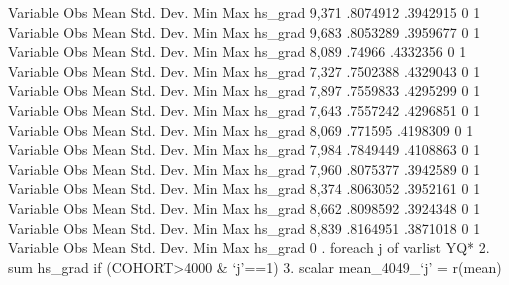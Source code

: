 {\smallskip}
    Variable {\VBAR}        Obs        Mean    Std. Dev.       Min        Max
     hs_grad {\VBAR}      9,371    .8074912    .3942915          0          1
{\smallskip}
    Variable {\VBAR}        Obs        Mean    Std. Dev.       Min        Max
     hs_grad {\VBAR}      9,683    .8053289    .3959677          0          1
{\smallskip}
    Variable {\VBAR}        Obs        Mean    Std. Dev.       Min        Max
     hs_grad {\VBAR}      8,089      .74966    .4332356          0          1
{\smallskip}
    Variable {\VBAR}        Obs        Mean    Std. Dev.       Min        Max
     hs_grad {\VBAR}      7,327    .7502388    .4329043          0          1
{\smallskip}
    Variable {\VBAR}        Obs        Mean    Std. Dev.       Min        Max
     hs_grad {\VBAR}      7,897    .7559833    .4295299          0          1
{\smallskip}
    Variable {\VBAR}        Obs        Mean    Std. Dev.       Min        Max
     hs_grad {\VBAR}      7,643    .7557242    .4296851          0          1
{\smallskip}
    Variable {\VBAR}        Obs        Mean    Std. Dev.       Min        Max
     hs_grad {\VBAR}      8,069     .771595    .4198309          0          1
{\smallskip}
    Variable {\VBAR}        Obs        Mean    Std. Dev.       Min        Max
     hs_grad {\VBAR}      7,984    .7849449    .4108863          0          1
{\smallskip}
    Variable {\VBAR}        Obs        Mean    Std. Dev.       Min        Max
     hs_grad {\VBAR}      7,960    .8075377    .3942589          0          1
{\smallskip}
    Variable {\VBAR}        Obs        Mean    Std. Dev.       Min        Max
     hs_grad {\VBAR}      8,374    .8063052    .3952161          0          1
{\smallskip}
    Variable {\VBAR}        Obs        Mean    Std. Dev.       Min        Max
     hs_grad {\VBAR}      8,662    .8098592    .3924348          0          1
{\smallskip}
    Variable {\VBAR}        Obs        Mean    Std. Dev.       Min        Max
     hs_grad {\VBAR}      8,839    .8164951    .3871018          0          1
{\smallskip}
    Variable {\VBAR}        Obs        Mean    Std. Dev.       Min        Max
     hs_grad {\VBAR}          0
{\smallskip}
. foreach j of varlist YQ* {\lbr}
  2.                 sum hs_grad if (COHORT>4000 \& `j'==1)
  3.                 scalar mean_4049_`j' = r(mean)
